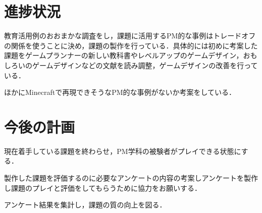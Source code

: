 \documentclass[uplatex,twocolumn,dvipdfmx]{jsarticle}
\begin{document}
\section{進捗状況}
教育活用例のおおまかな調査をし，課題に活用するPM的な事例はトレードオフの関係を使うことに決め，課題の製作を行っている．具体的には初めに考案した課題をゲームプランナーの新しい教科書やレベルアップのゲームデザイン，おもしろいのゲームデザインなどの文献を読み調整，ゲームデザインの改善を行っている．


ほかにMinecraftで再現できそうなPM的な事例がないか考案をしている．



\section{今後の計画}
現在着手している課題を終わらせ，PM学科の被験者がプレイできる状態にする．


製作した課題を評価するのに必要なアンケートの内容の考案しアンケートを製作し課題のプレイと評価をしてもらうために協力をお願いする．


アンケート結果を集計し，課題の質の向上を図る．



\end{document}
